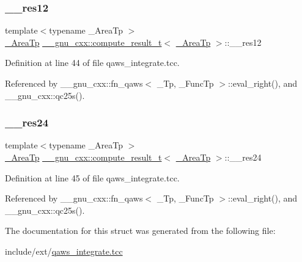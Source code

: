 \subsubsection{\texorpdfstring{\+\_\+\+\_\+res12}{\_\_res12}}
{\footnotesize\ttfamily template$<$typename \+\_\+\+Area\+Tp $>$ \\
\hyperlink{namespace____gnu__cxx_ae97a51b75e19c30f48d27fac4664de6e}{\+\_\+\+Area\+Tp} \hyperlink{struct____gnu__cxx_1_1compute__result__t}{\+\_\+\+\_\+gnu\+\_\+cxx\+::compute\+\_\+result\+\_\+t}$<$ \hyperlink{namespace____gnu__cxx_ae97a51b75e19c30f48d27fac4664de6e}{\+\_\+\+Area\+Tp} $>$\+::\+\_\+\+\_\+res12}



Definition at line 44 of file qaws\+\_\+integrate.\+tcc.



Referenced by \+\_\+\+\_\+gnu\+\_\+cxx\+::fn\+\_\+qaws$<$ \+\_\+\+Tp, \+\_\+\+Func\+Tp $>$\+::eval\+\_\+right(), and \+\_\+\+\_\+gnu\+\_\+cxx\+::qc25s().

\mbox{\label{struct____gnu__cxx_1_1compute__result__t_a9df5b5d8aee2913b9214d1d5c0b409ce}} 
\subsubsection{\texorpdfstring{\+\_\+\+\_\+res24}{\_\_res24}}
{\footnotesize\ttfamily template$<$typename \+\_\+\+Area\+Tp $>$ \\
\hyperlink{namespace____gnu__cxx_ae97a51b75e19c30f48d27fac4664de6e}{\+\_\+\+Area\+Tp} \hyperlink{struct____gnu__cxx_1_1compute__result__t}{\+\_\+\+\_\+gnu\+\_\+cxx\+::compute\+\_\+result\+\_\+t}$<$ \hyperlink{namespace____gnu__cxx_ae97a51b75e19c30f48d27fac4664de6e}{\+\_\+\+Area\+Tp} $>$\+::\+\_\+\+\_\+res24}



Definition at line 45 of file qaws\+\_\+integrate.\+tcc.



Referenced by \+\_\+\+\_\+gnu\+\_\+cxx\+::fn\+\_\+qaws$<$ \+\_\+\+Tp, \+\_\+\+Func\+Tp $>$\+::eval\+\_\+right(), and \+\_\+\+\_\+gnu\+\_\+cxx\+::qc25s().



The documentation for this struct was generated from the following file\+:\begin{DoxyCompactItemize}
\item 
include/ext/\hyperlink{qaws__integrate_8tcc}{qaws\+\_\+integrate.\+tcc}\end{DoxyCompactItemize}
